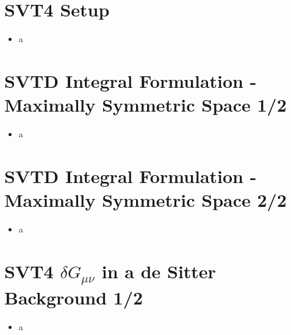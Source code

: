 \documentclass[10pt,letterpaper]{article}
\numberwithin{equation}{section}
\begin{document}

\section{SVT4 Setup}
\begin{itemize}
	\item a
\end{itemize}


\section{SVTD Integral Formulation - Maximally Symmetric Space 1/2}
\begin{itemize}
	\item a
\end{itemize}


\section{SVTD Integral Formulation - Maximally Symmetric Space 2/2}
\begin{itemize}
	\item a
\end{itemize}


\section{SVT4 $\delta G_{\mu\nu}$ in a de Sitter Background 1/2}
\begin{itemize}
	\item a
\end{itemize}

\end{document}
